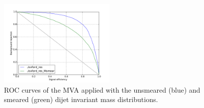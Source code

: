 \begin{figure}[t]
\begin{center}
\includegraphics[width=0.50\textwidth]{plots/Msmear/roc.pdf}
\caption{\small ROC curves of the MVA applied with the unsmeared (blue) and smeared (green) dijet invariant mass distributions.}
\label{fig:smearedROC}
\end{center}
\end{figure}
            
